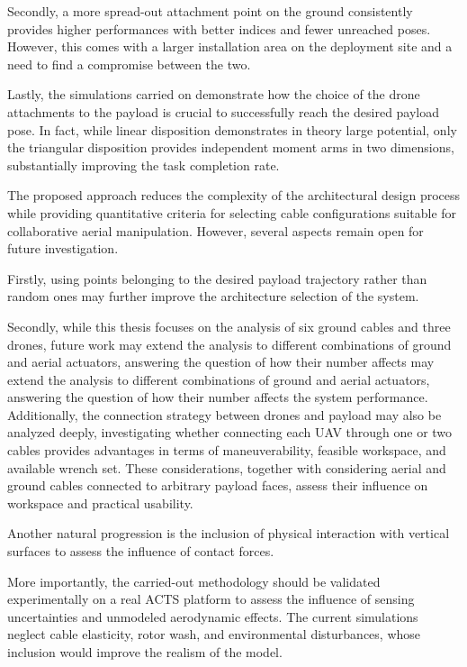 Secondly, a more spread-out attachment point on the ground consistently provides higher performances with better indices and fewer unreached poses. However, this comes with a larger installation area on the deployment site and a need to find a compromise between the two.

Lastly, the simulations carried on demonstrate how the choice of the drone attachments to the payload is crucial to successfully reach the desired payload pose. In fact, while linear disposition demonstrates in theory large potential, only the triangular disposition provides independent moment arms in two dimensions, substantially improving the task completion rate.

The proposed approach reduces the complexity of the architectural design process while providing quantitative criteria for selecting cable configurations suitable for collaborative aerial manipulation. However, several aspects remain open for future investigation. 

Firstly, using points belonging to the desired payload trajectory rather than random ones may further improve the architecture selection of the system.

Secondly, while this thesis focuses on the analysis of six ground cables and three drones, future work may extend the analysis to different combinations of ground and aerial actuators, answering the question of how their number affects may extend the analysis to different combinations of ground and aerial actuators, answering the question of how their number affects the system performance. Additionally, the connection strategy between drones and payload may also be analyzed deeply, investigating whether connecting each UAV through one or two cables provides advantages in terms of maneuverability, feasible workspace, and available wrench set. These considerations, together with considering aerial and ground cables connected to arbitrary payload faces, assess their influence on workspace and practical usability.

Another natural progression is the inclusion of physical interaction with vertical surfaces to assess the influence of contact forces. 

More importantly, the carried-out methodology should be validated experimentally on a real ACTS platform to assess the influence of sensing uncertainties and unmodeled aerodynamic effects. The current simulations neglect cable elasticity, rotor wash, and environmental disturbances, whose inclusion would improve the realism of the model.